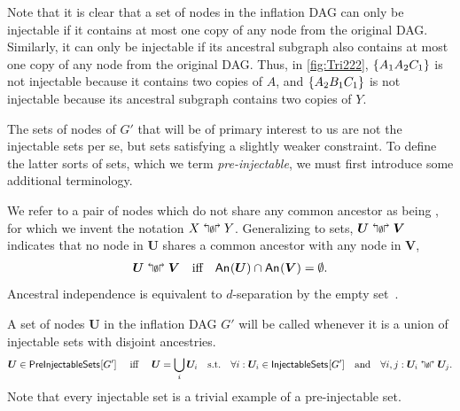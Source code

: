 Note that it is clear that a set of nodes in the inflation DAG can only be injectable if it contains at most one copy of any node from the original DAG.  Similarly, it can only be injectable if its ancestral subgraph also contains at most one copy of any node from the original DAG.  
Thus, in \cref{fig:Tri222}, $\left\lbrace A_1 A_2 C_1\right\rbrace$ is not injectable because it contains two copies of $A$, and $\left\lbrace A_2 B_1 C_1\right\rbrace$ is not injectable because its ancestral subgraph contains two copies of $Y$. 

The sets of nodes of $G'$ that will be of primary interest to us are not the injectable sets per se, but sets satisfying a slightly weaker constraint.
To define the latter sorts of sets, which we term {\em pre-injectable}, we must first introduce some additional terminology. 

We refer to a pair of nodes which do not share any common ancestor as being , for which we invent the notation $X\mathrel{\mathopen{\Lsh}{\scriptstyle\emptyset}\mathclose{\Rsh}} Y$. Generalizing to sets, $\bm{U}\mathrel{\mathopen{\Lsh}{\scriptstyle\emptyset}\mathclose{\Rsh}} \bm{V}$ indicates that no node in $\bm{U}$ shares a common ancestor with any node in $\bm{V}$, 
\begin{align}
\bm{U}\mathrel{\mathopen{\Lsh}{\scriptstyle\emptyset}\mathclose{\Rsh}} \bm{V} \quad \text{iff} \quad {\mathsf{An}_{}}\lparen\bm{U}\rparen\cap{\mathsf{An}_{}}\lparen\bm{V}\rparen=\emptyset.
\end{align}
Ancestral independence is equivalent to $d$-separation by the empty set~\cite{pearl2009causality,spirtes2011causation,studeny2005probabilistic,koller2009probabilistic}. 


  A set of nodes $\bm{U}$ in the inflation DAG $G'$ will be called  whenever it is a union of injectable sets with disjoint ancestries. 
\begin{align}\label{eq:definjectable}
\bm{U}\in{\operatorname{\mathsf{PreInjectableSets}}_{}}\lbrack G'\rbrack \quad\text{ iff }\quad  \bm{U}=\bigcup_i \bm{U}_i \quad \text{s.t.}\quad \forall i 
: \bm{U}_i \in {\operatorname{\mathsf{InjectableSets}}_{}}\lbrack G'\rbrack\quad \text{and}\quad \forall i,j
: \bm{U}_i \mathrel{\mathopen{\Lsh}{\scriptstyle\emptyset}\mathclose{\Rsh}} \bm{U}_j.
\end{align}
Note that every injectable set is a trivial example of a pre-injectable set.

